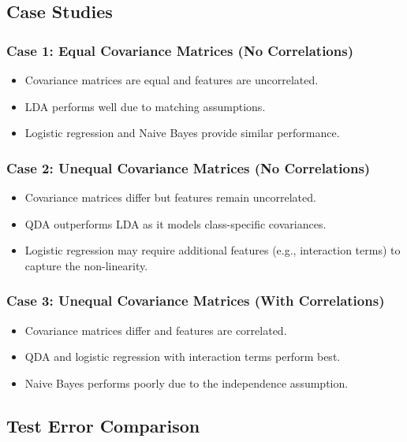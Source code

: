 \documentclass{article}
\begin{document}
\subsection{Case Studies}

\subsubsection{Case 1: Equal Covariance Matrices (No Correlations)}

\begin{itemize}
    \item Covariance matrices are equal and features are uncorrelated.
    \item LDA performs well due to matching assumptions.
    \item Logistic regression and Naive Bayes provide similar performance.
\end{itemize}

\subsubsection{Case 2: Unequal Covariance Matrices (No Correlations)}

\begin{itemize}
    \item Covariance matrices differ but features remain uncorrelated.
    \item QDA outperforms LDA as it models class-specific covariances.
    \item Logistic regression may require additional features (e.g., interaction terms) to capture the non-linearity.
\end{itemize}

\subsubsection{Case 3: Unequal Covariance Matrices (With Correlations)}

\begin{itemize}
    \item Covariance matrices differ and features are correlated.
    \item QDA and logistic regression with interaction terms perform best.
    \item Naive Bayes performs poorly due to the independence assumption.
\end{itemize}

\subsection{Test Error Comparison}
\end{document}
